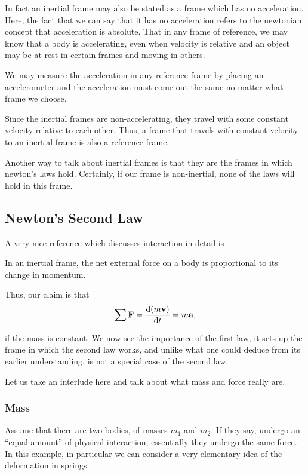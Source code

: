 In fact an inertial frame may also be stated as a frame which has no acceleration.
Here, the fact that we can say that it has no acceleration refers
to the newtonian concept that acceleration is absolute. That in any frame 
of reference, we may know that a body is accelerating, even when velocity is 
relative and an object may be at rest in certain frames and moving in others.

We may measure the acceleration in any reference frame by placing 
an accelerometer and the acceleration must come out the same no matter
what frame we choose.

Since the inertial frames are non-accelerating, they travel with some constant velocity 
relative to each other. Thus, a frame that travels with constant velocity 
to an inertial frame is also a reference frame.

Another way to talk about inertial frames is that they are the frames in which newton's laws
hold. Certainly, if our frame is non-inertial, none of the laws will hold in this frame.

\subsection{Newton's Second Law}
\label{sec: newton's second law}
A very nice reference which discusses interaction in detail is \cite{kleppner}

\begin{axioms}
     In an inertial frame, the net external force on a body is proportional to its change in 
    momentum.
\end{axioms}

Thus, our claim is that
\[\sum \mathbf{F} = \dv{(m\boldsymbol{\mathbf{v}})}{t} = m\boldsymbol{\mathbf{a}},\]

if the mass is constant. We now see the importance of the first law, it sets up the 
frame in which the second law works, and unlike what one could 
deduce from its earlier understanding, is not 
a special case of the second law.

Let us take an interlude here and talk about what mass and force really are.

\subsubsection{Mass}

Assume that there are two bodies, of masses \(m_1\) and \(m_2\).
If they say, undergo an ``equal amount'' of physical interaction,
essentially they undergo the same force. In this example, in particular 
we can consider a very elementary idea of the deformation in springs.

